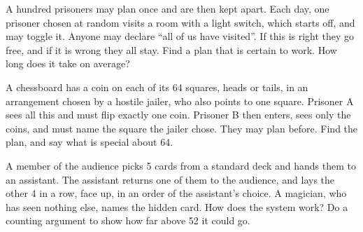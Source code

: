 \begin{question}\label{iq:iv1:logic-riddles:33}
A hundred prisoners may plan once and are then kept apart. Each day, one prisoner chosen at random visits a room with a light switch, which starts off, and may toggle it. Anyone may declare ``all of us have visited''. If this is right they go free, and if it is wrong they all stay. Find a plan that is certain to work. How long does it take on average?
\end{question}

\begin{question}\label{iq:iv1:logic-riddles:34}
A chessboard has a coin on each of its 64 squares, heads or tails, in an arrangement chosen by a hostile jailer, who also points to one square. Prisoner A sees all this and must flip exactly one coin. Prisoner B then enters, sees only the coins, and must name the square the jailer chose. They may plan before. Find the plan, and say what is special about 64.
\end{question}

\begin{question}\label{iq:iv1:logic-riddles:35}
A member of the audience picks 5 cards from a standard deck and hands them to an assistant. The assistant returns one of them to the audience, and lays the other 4 in a row, face up, in an order of the assistant's choice. A magician, who has seen nothing else, names the hidden card. How does the system work? Do a counting argument to show how far above 52 it could go.
\end{question}
